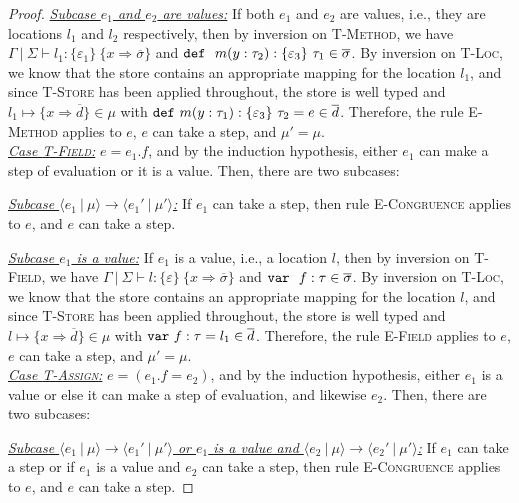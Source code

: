 \begin{proof}
\underline{\textit{Subcase $e_1$ and $e_2$ are values:}} If both $e_1$ and $e_2$ are values, i.e., they are locations $l_1$ and $l_2$ respectively, then by inversion on \textsc{T-Method}, we have \mbox{$\Gamma~|~\Sigma \vdash l_1 : \{ \varepsilon_1 \}~\{ x \Rightarrow \overline{\sigma} \}$} and\linebreak
\mbox{$\mathtt{def}~~ m(y : \tau_2) : \{ \varepsilon_3 \}~\tau_1 \in \overline{\sigma}$}. By inversion on \textsc{T-Loc}, we know that the store contains an appropriate mapping for the location $l_1$, and since \textsc{T-Store} has been applied throughout, the store is well typed and $l_1 \mapsto \{ x \Rightarrow \overline{d} \} \in \mu$ with $\mathtt{def}~ m(y : \tau_1) : \{ \varepsilon_3 \}~\tau_2 = e \in \overline{d}$. Therefore, the rule \textsc{E-Method} applies to $e$, $e$ can take a step, and $\mu' = \mu$.
\\

\noindent\underline{\textit{Case \textsc{T-Field}:}}
$e = e_1.f$, and by the induction hypothesis, either $e_1$ can make a step of evaluation or it is a value. Then, there are two subcases:

\underline{\textit{Subcase $\langle e_1~|~\mu \rangle \longrightarrow \langle e_1'~|~\mu' \rangle$:}} If $e_1$ can take a step, then rule \textsc{E-Congruence} applies to $e$, and $e$ can take a step.

\underline{\textit{Subcase $e_1$ is a value:}} If $e_1$ is a value, i.e., a location $l$, then by inversion on \textsc{T-Field}, we have\linebreak
\mbox{$\Gamma~|~\Sigma \vdash l : \{ \varepsilon \}~\{ x \Rightarrow \overline{\sigma} \}$} and $\mathtt{var}~~ f : \tau \in \overline{\sigma}$. By inversion on \textsc{T-Loc}, we know that the store contains an appropriate mapping for the location $l$, and since \textsc{T-Store} has been applied throughout, the store is well typed and $l \mapsto \{ x \Rightarrow \overline{d} \} \in \mu$ with $\mathtt{var}~ f : \tau = l_1 \in \overline{d}$. Therefore, the rule \textsc{E-Field} applies to $e$, $e$ can take a step, and $\mu' = \mu$.
\\

\noindent\underline{\textit{Case \textsc{T-Assign}:}}
$e = (e_1.f = e_2)$, and by the induction hypothesis, either $e_1$ is a value or else it can make a step of evaluation, and likewise $e_2$. Then, there are two subcases:

\underline{\textit{Subcase $\langle e_1~|~\mu \rangle \longrightarrow \langle e_1'~|~\mu' \rangle$ or $e_1$ is a value and $\langle e_2~|~\mu \rangle \longrightarrow \langle e_2'~|~\mu' \rangle$:}} If $e_1$ can take a step or if $e_1$ is a value and $e_2$ can take a step, then rule \textsc{E-Congruence} applies to $e$, and $e$ can take a step.


\end{proof}
